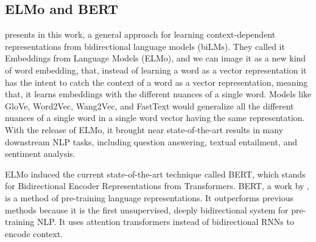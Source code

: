 \subsection{ELMo and BERT}

 presents in this work, a general approach for learning context-dependent representations from bidirectional language models (biLMs). They called it Embeddings from Language Models (ELMo), and we can image it as a new kind of word embedding, that, instead of learning a word as a vector representation it has the intent to catch the context of a word as a vector representation, meaning that, it learns embeddings with the different nuances of a single word. Models like GloVe, Word2Vec, Wang2Vec, and FastText would generalize all the different nuances of a single word in a single word vector having the same representation. With the release of ELMo, it brought near state-of-the-art results in many downstream NLP tasks,  including question answering, textual entailment, and sentiment analysis.

ELMo induced the current state-of-the-art technique called BERT, which stands for Bidirectional Encoder Representations from Transformers.  
BERT, a work by , is a method of pre-training language representations. It outperforms previous methods because it is the first unsupervised, deeply bidirectional system for pre-training NLP. It uses attention transformers instead of bidirectional RNNs to encode context.


